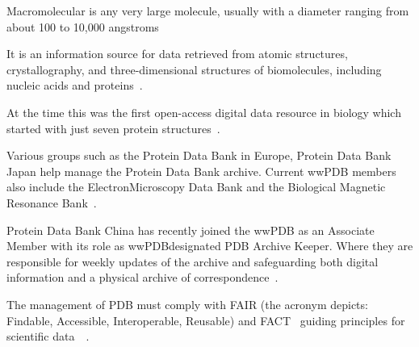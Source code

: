 \documentclass[]{final_report}
\begin{document}
\begin{definition}[Macromolecular]
    Macromolecular is any very large molecule, usually with a diameter ranging from about 100 to 10,000 angstroms
\end{definition}

It is an information source for data retrieved from atomic structures, crystallography, and three-dimensional structures of biomolecules, including nucleic acids and proteins~\cite{behzadi_worldwide_2021}. 

At the time this was the first open-access digital data resource in biology which started with just seven protein structures~\cite{burley_rcsb_2022}.

Various groups such as the Protein Data Bank in Europe, Protein Data Bank Japan help manage the Protein Data Bank archive. Current wwPDB members also include the ElectronMicroscopy Data Bank and the Biological Magnetic Resonance Bank~\cite{burley_rcsb_2022}.

Protein Data Bank China has recently joined the wwPDB as an Associate Member with its role as wwPDBdesignated PDB Archive Keeper. Where they are responsible for weekly updates of the archive and safeguarding both digital information and a physical archive of correspondence~\cite{burley1_rcsb_2022}.

The management of PDB must comply with FAIR (the acronym depicts: Findable, Accessible, Interoperable, Reusable) and FACT~\cite{van_der_aalst_responsible_2017} guiding principles for scientific data~\cite{wilkinson_fair_2016}~\cite{westbrook_impact_2020}.
\end{document}
